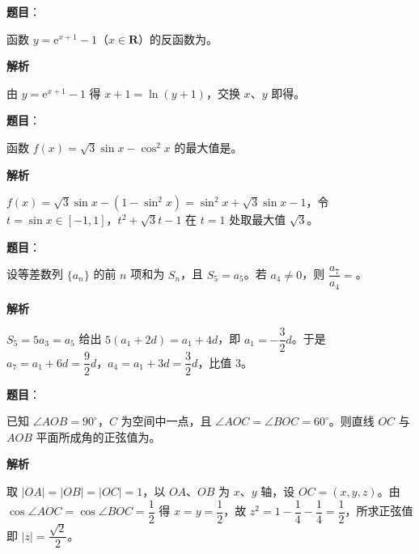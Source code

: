 \begin{answer}

\textbf{题目}：

函数 $y=\mathrm e^{x+1}-1$（$x\in\mathbf R$）的反函数为\gkblank{}。

\textbf{解析}

由 $y=\mathrm e^{x+1}-1$ 得 $x+1=\ln(y+1)$，交换 $x$、$y$ 即得。


\end{answer}
\begin{answer}

\textbf{题目}：

函数 $f(x)=\sqrt3\sin x-\cos^2x$ 的最大值是\gkblank{}。

\textbf{解析}

$f(x)=\sqrt3\sin x-(1-\sin^2x)=\sin^2x+\sqrt3\sin x-1$，令 $t=\sin x\in[-1,1]$，$t^2+\sqrt3t-1$ 在 $t=1$ 处取最大值 $\sqrt3$。


\end{answer}
\begin{answer}

\textbf{题目}：

设等差数列 $\{a_n\}$ 的前 $n$ 项和为 $S_n$，且 $S_5=a_5$。若 $a_4\neq0$，则 $\dfrac{a_7}{a_4}=$\gkblank{}。

\textbf{解析}

$S_5=5a_3=a_5$ 给出 $5(a_1+2d)=a_1+4d$，即 $a_1=-\dfrac32d$。于是 $a_7=a_1+6d=\dfrac92d$，$a_4=a_1+3d=\dfrac32d$，比值 $3$。


\end{answer}
\begin{answer}

\textbf{题目}：

已知 $\angle AOB=90^\circ$，$C$ 为空间中一点，且 $\angle AOC=\angle BOC=60^\circ$。则直线 $OC$ 与 $AOB$ 平面所成角的正弦值为\gkblank{}。

\textbf{解析}

取 $|OA|=|OB|=|OC|=1$，以 $OA$、$OB$ 为 $x$、$y$ 轴，设 $OC=(x,y,z)$。由 $\cos\angle AOC=\cos\angle BOC=\dfrac12$ 得 $x=y=\dfrac12$，故 $z^2=1-\dfrac14-\dfrac14=\dfrac12$，所求正弦值即 $|z|=\dfrac{\sqrt2}2$。


\end{answer}
